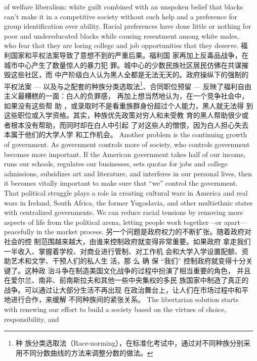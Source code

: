\begin{paracol}{2}
of welfare liberalism: white guilt combined with an unspoken
belief that blacks can't make it in a competitive society without
such help and a preference for group identification over ability.
Racial preferences have done little or nothing for poor and undereducated blacks while causing resentment among white
males, who fear that they are losing college and job opportunities that they deserve.
\switchcolumn
福利国家和平权法案导致了意想不到的严重后果。福利国
家再加上反毒品战争，在城市中心产生了数量惊人的暴力犯
罪。城中心的少数民族社区居民仿佛在共谋摧毁这些社区，而
中产阶级白人认为黑人全都是无法无天的。政府操纵下的强制的平权法案 --- 以及与之配套的种族分类选取法\footnote{种 族分类选取法（Race-norming），在标准化考试中，通过对不同种族分别采用不同分数曲线的方法来调整分数的做法。}、合同职位预留 --- 反映了福利自由主义最糟糕的一面：白人的负罪感，
再加上想当然地认为，在一个竞争社会中，如果没有这些帮
助 ，或录取时不是看重族群身份超过个人能力，黑人就无法得
到这些职位或入学资格。其实，种族优先政策对穷人和未受教
育的黑人帮助很少或者根本没有帮助，而同时却在白人中引起
了对这些人的憎恨，因为白人担心失去本属于他们的大学人学
和工作机会。
\switchcolumn*
Another problem is the continuing growth of government.
As government controls more of society, who controls government becomes more important. If the American government
takes half of our income, runs our schools, regulates our businesses, sets quotas for jobs and college admissions, subsidizes
art and literature, and interferes in our personal lives, then it
becomes vitally important to make sure that ``we'' control the
government. That political struggle plays a role in creating cultural wars in America and real wars in Ireland, South Africa, the
former Yugoslavia, and other multiethnic states with centralized governments. We can reduce racial tensions by removing
more aspects of life from the political arena, letting people work
together---or apart---peacefully in the market process.
\switchcolumn
另一个问题是政府权力的不断扩张。随着政府对社会的控
制范围越来越大，由谁来控制政府就变得非常重要。如果政府
拿走我们一半收入、掌握着学校、对商业进行管制、对工作机
会和大学入学设置配额、资助艺术和文学、干预人们的私人生
活，那 么 确 保 “我们” 控制政府就变得十分关键了。这种政
治斗争在制造美国文化战争的过程中扮演了相当重要的角色，
并且在爱尔兰、南非、前南斯拉夫和其他一些中央集权的多民
族国家中制造了真正的战争。可以通过让大部分生活不再出现
在政治舞台上，让人们在市场过程中和平地进行合作，来缓解
不同种族间的紧张关系。
\switchcolumn*
The libertarian solution starts with renewing our effort to
build a society based on the virtues of choice, responsibility, and

\end{paracol}
